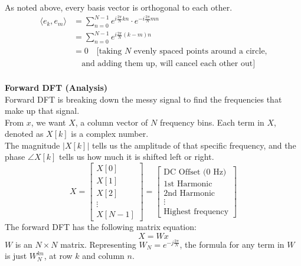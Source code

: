 \documentclass[../linear-algebra.tex]{subfiles}
\begin{document}
As noted above, every basis vector is orthogonal to each other.
\begin{align*}
    \langle e_k, e_m \rangle &= \sum_{n=0}^{N-1} e^{i\frac{2\pi}{N}kn} \cdot e^{-i\frac{2\pi}{N}mn}\\
    &= \sum_{n=0}^{N-1} e^{i\frac{2\pi}{N}(k-m)n}\\
    &= 0 \quad [\text{taking $N$ evenly spaced points around a circle,}\\
    & \quad \text{and adding them up, will cancel each other out}]
\end{align*}
\\
\textbf{Forward DFT (Analysis)}\\
Forward DFT is breaking down the messy signal to find the frequencies that make up that signal.\\
From $x$, we want $X$, a column vector of $N$ frequency bins. Each term in $X$, denoted as $X[k]$ is a complex number.\\
The magnitude $|X[k]|$ tells us the amplitude of that specific frequency, and the phase $\angle X[k]$ tells us how much it is shifted left or right.\\
$$X = \begin{bmatrix} X[0] \\ X[1] \\ X[2] \\ \vdots \\ X[N-1] \end{bmatrix} = \begin{bmatrix} \text{DC Offset (0 Hz)} \\ \text{1st Harmonic} \\ \text{2nd Harmonic} \\ \vdots \\ \text{Highest frequency} \end{bmatrix}$$
The forward DFT has the following matrix equation:
$$X = Wx$$
$W$ is an $N \times N$ matrix. Representing $W_N = e^{-j\frac{2\pi}{N}}$, the formula for any term in $W$ is just $W_N^{kn}$, at row $k$ and column $n$.
\end{document}
